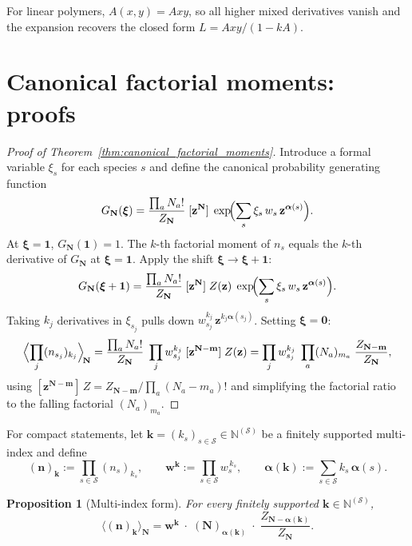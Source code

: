 \documentclass[11pt]{amsart}
\newcommand{\Species}{\mathcal{S}}
\providecommand{\Nat}{\mathbb{N}}
\newcommand{\GFensemble}{Z}
\theoremstyle{definition}
\theoremstyle{plain}
\newtheorem{proposition}{Proposition}
\theoremstyle{remark}
\begin{document}
For linear polymers, $A(x,y)=Axy$, so all higher mixed derivatives vanish and the expansion recovers the closed form $L=Axy/(1-kA)$.


\section{Canonical factorial moments: proofs}
\label{app:proofs}

\begin{proof}[Proof of Theorem~\ref{thm:canonical_factorial_moments}]
Introduce a formal variable $\xi_s$ for each species $s$ and define the canonical probability generating function
\[
G_{\mathbf{N}}(\boldsymbol{\xi})
=\frac{\prod_a N_a!}{\GFensemble_{\mathbf{N}}}\;
[\mathbf{z}^{\mathbf{N}}]\;
\exp\!\Bigl(\sum_{s}\xi_s\,w_s\,\mathbf{z}^{\boldsymbol{\alpha}(s)}\Bigr).
\]
At $\boldsymbol{\xi}=\mathbf{1}$, $G_{\mathbf{N}}(\mathbf{1})=1$.
The $k$-th factorial moment of $n_s$ equals the $k$-th derivative of $G_{\mathbf{N}}$ at $\boldsymbol{\xi}=\mathbf{1}$.
Apply the shift $\boldsymbol{\xi}\to\boldsymbol{\xi}+\mathbf{1}$:
\[
G_{\mathbf{N}}(\boldsymbol{\xi}+\mathbf{1})
=\frac{\prod_a N_a!}{\GFensemble_{\mathbf{N}}}\;
[\mathbf{z}^{\mathbf{N}}]\;\GFensemble(\mathbf{z})\;\exp\!\Bigl(\sum_{s}\xi_s\,w_s\,\mathbf{z}^{\boldsymbol{\alpha}(s)}\Bigr).
\]
Taking $k_j$ derivatives in $\xi_{s_j}$ pulls down $w_{s_j}^{k_j}\,\mathbf{z}^{k_j\boldsymbol{\alpha}(s_j)}$.
Setting $\boldsymbol{\xi}=\mathbf{0}$:
\[
\Bigl\langle \prod_j(n_{s_j})_{k_j}\Bigr\rangle_{\!\mathbf{N}}
=\frac{\prod_a N_a!}{\GFensemble_{\mathbf{N}}}\;\prod_j w_{s_j}^{k_j}\;
[\mathbf{z}^{\mathbf{N}-\mathbf{m}}]\;\GFensemble(\mathbf{z})
=\prod_j w_{s_j}^{k_j}\;\prod_a(N_a)_{m_a}\;
\frac{\GFensemble_{\mathbf{N}-\mathbf{m}}}{\GFensemble_{\mathbf{N}}},
\]
using $[\mathbf{z}^{\mathbf{N}-\mathbf{m}}]\,\GFensemble = \GFensemble_{\mathbf{N}-\mathbf{m}}/\prod_a(N_a-m_a)!$ and simplifying the factorial ratio to the falling factorial $(N_a)_{m_a}$.
\end{proof}

For compact statements, let $\mathbf{k}=(k_s)_{s\in\Species}\in\Nat^{(\Species)}$ be a finitely supported multi-index and define
\[
(\mathbf{n})_{\mathbf{k}} := \prod_{s\in\Species}(n_s)_{k_s},\qquad
\mathbf{w}^{\mathbf{k}} := \prod_{s\in\Species}w_s^{\,k_s},\qquad
\boldsymbol{\alpha}(\mathbf{k}) := \sum_{s\in\Species}k_s\,\boldsymbol{\alpha}(s).
\]

\begin{proposition}[Multi-index form]
\label{prop:canonical_factorial_moments_multiindex}
For every finitely supported $\mathbf{k}\in\Nat^{(\Species)}$,
\begin{equation}\label{eq:canonical_factorial_moments_multiindex}
\langle (\mathbf{n})_{\mathbf{k}}\rangle_{\mathbf{N}}
=
\mathbf{w}^{\mathbf{k}}
\;\cdot\;
(\mathbf{N})_{\boldsymbol{\alpha}(\mathbf{k})}
\;\cdot\;
\frac{\GFensemble_{\mathbf{N}-\boldsymbol{\alpha}(\mathbf{k})}}{\GFensemble_{\mathbf{N}}}.
\end{equation}
\end{proposition}
\end{document}
